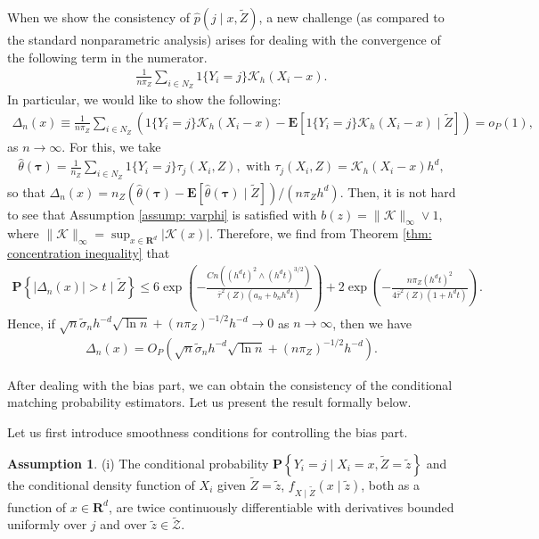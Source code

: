 \documentclass[12pt, fullpage]{amsart}
\theoremstyle{definition}
\theoremstyle{definition}
\newtheorem{assumption}{Assumption}[section]
\theoremstyle{definition}
\begin{document}
\begin{bibunit}[econometrica]
When we show the consistency of $\hat p(j \mid x,\tilde Z)$, a new challenge (as compared to the standard nonparametric analysis) arises for dealing with the convergence of the following term in the numerator.
\begin{align}
	\frac{1}{n \pi_Z} \sum_{i \in N_Z} 1\{Y_i = j\} \mathcal{K}_h\left( X_i - x \right).
\end{align}
In particular, we would like to show the following:
\begin{align}
	\label{Delta n}
		\Delta_n(x) \equiv \frac{1}{n \pi_Z} \sum_{i \in N_Z} \left( 1\{Y_i = j\} \mathcal{K}_h\left( X_i - x \right) - \mathbf{E}\left[ 1\{Y_i = j\} \mathcal{K}_h\left( X_i - x \right) \mid \tilde Z\right] \right) = o_P(1),
\end{align}
as $n \rightarrow \infty$. For this, we take
\begin{align}
	\hat \theta(\boldsymbol{\tau}) = \frac{1}{n_Z} \sum_{i \in N_Z} 1\{Y_i = j\} \tau_{j}\left( X_i, Z \right), \text{ with } \tau_{j}\left( X_i, Z \right) = \mathcal{K}_h\left( X_i - x \right) h^d,
\end{align}
so that $\Delta_n(x) = n_Z (\hat \theta(\boldsymbol{\tau}) - \mathbf{E}[\hat \theta(\boldsymbol{\tau}) \mid \tilde Z])/ (n \pi_Z h^d)$. Then, it is not hard to see that Assumption \ref{assump: varphi} is satisfied with $b(z) = \| \mathcal{K}\|_\infty \vee 1$, where $\|\mathcal{K}\|_\infty = \sup_{x \in \mathbf{R}^d} |\mathcal{K}(x)|$. Therefore, we find from Theorem \ref{thm: concentration inequality} that
\begin{align}
	\label{bd}
   \mathbf{P}\left\{ |\Delta_n(x) | > t \mid \tilde Z \right\}
  \le 6 \exp \left( - \frac{\displaystyle C n ((h^d t)^2 \wedge (h^d  t)^{3/2})}{\displaystyle \overline \tau^2(Z) (a_n + b_n h^d t)} \right) + 2 \exp\left( - \frac{\displaystyle n \pi_Z (h^d t)^2}{\displaystyle 4 \overline \tau^2(Z)(1 + h^d t)} \right).
\end{align}
Hence, if $\sqrt{n} \tilde \sigma_n h^{-d} \sqrt{\ln n}  + (n \pi_Z)^{-1/2} h^{-d} \rightarrow 0$ as $n \rightarrow \infty$, then we have
\begin{align*}
	\Delta_n(x) = O_P\left(\sqrt{n} \tilde \sigma_n h^{-d} \sqrt{\ln n} + (n \pi_Z)^{-1/2} h^{-d}\right). 
\end{align*}

After dealing with the bias part, we can obtain the consistency of the conditional matching probability estimators. Let us present the result formally below.

Let us first introduce smoothness conditions for controlling the bias part.
\begin{assumption}
	\label{assump: kernel est}
     (i) The conditional probability $\mathbf{P}\left\{Y_i = j \mid X_i = x, \tilde Z = \tilde z \right\}$ and the conditional density function of $X_i$ given $\tilde Z=\tilde z$, $f_{X\mid \tilde Z}(x \mid \tilde z)$, both as a function of $x \in \mathbf{R}^d$, are twice continuously differentiable with derivatives bounded uniformly over $j$ and over $\tilde z \in \mathcal{\tilde Z}$.
     

\end{assumption}
\end{bibunit}
\end{document}
